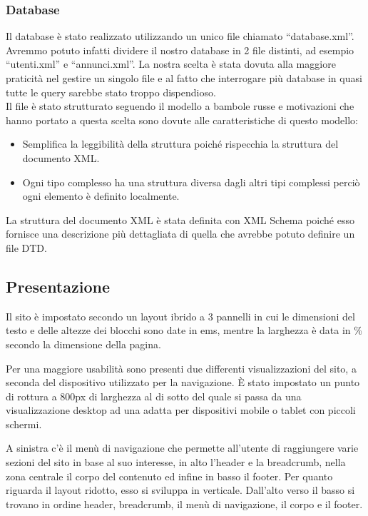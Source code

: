 \documentclass[12pt]{article}
\begin{document}
	
		\subsubsection{Database}
		Il database è stato realizzato utilizzando un unico file chiamato “database.xml”.
		Avremmo potuto infatti dividere il nostro database in 2 file distinti, ad esempio “utenti.xml” e “annunci.xml”.
		La nostra scelta è stata dovuta alla maggiore praticità nel gestire un singolo file e al fatto che interrogare più database in quasi tutte le query sarebbe stato troppo dispendioso.\\
		Il file è stato strutturato seguendo il modello a bambole russe e motivazioni che hanno portato a questa scelta sono dovute alle caratteristiche di questo modello:
		
		\begin{itemize}
			\item Semplifica la leggibilità della struttura poiché rispecchia la struttura del documento XML.
			\item Ogni tipo complesso ha una struttura diversa dagli altri tipi complessi perciò ogni elemento è definito localmente.
		\end{itemize}
		
		La struttura del documento XML è stata definita con XML Schema poiché esso fornisce una descrizione più dettagliata di quella che avrebbe potuto definire un file DTD.

	\subsection{Presentazione}
	
	Il sito è impostato secondo un layout ibrido a 3 pannelli in cui le dimensioni del testo e delle altezze dei blocchi sono date in ems, mentre la larghezza è data in \% secondo la dimensione della pagina.
	
	Per una maggiore usabilità sono presenti due differenti visualizzazioni del sito, a seconda del dispositivo utilizzato per la navigazione.
	È stato impostato un punto di rottura a 800px di larghezza al di sotto del quale si passa da una visualizzazione desktop ad una adatta per dispositivi mobile o tablet con piccoli schermi.
	
	A sinistra c'è il menù di navigazione che permette all’utente di raggiungere varie sezioni del sito in base al suo interesse, in alto l'header e la breadcrumb, nella zona centrale il corpo del contenuto ed infine in basso il footer.
	Per quanto riguarda il layout ridotto, esso si sviluppa in verticale. Dall’alto verso il basso si trovano in ordine header, breadcrumb, il menù di navigazione, il corpo e il footer.
		
\end{document}
